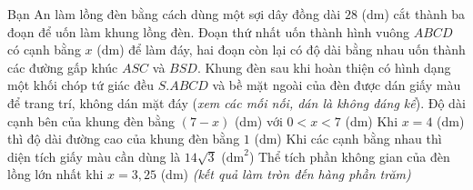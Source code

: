 \begin{ex}%
	Bạn An làm lồng đèn bằng cách dùng một sợi dây đồng dài $28$ (dm) cắt thành ba đoạn để uốn làm khung lồng đèn. Đoạn thứ nhất uốn thành hình vuông $ABCD$ có cạnh bằng $x$ (dm) để làm đáy, hai đoạn còn lại có độ dài bằng nhau uốn thành các đường gấp khúc $ASC$ và $BSD$. Khung đèn sau khi hoàn thiện có hình dạng một khối chóp tứ giác đều $S.ABCD$ và bề mặt ngoài của đèn được dán giấy màu để trang trí, không dán mặt đáy (\textit{xem các mối nối, dán là không đáng kể}).
	\choiceTF
	{\True Độ dài cạnh bên của khung đèn bằng $(7-x)$ (dm) với $0<x<7$ (dm)}
	{\True Khi $x=4$ (dm) thì độ dài đường cao của khung đèn bằng $1$ (dm)}
	{Khi các cạnh bằng nhau thì diện tích giấy màu cần dùng là $14\sqrt{3}$ ($\mathrm{dm}^2$)}
	{\True Thể tích phần không gian của đèn lồng lớn nhất khi $x=3{,}25$ (dm) \textit{(kết quả làm tròn đến hàng phần trăm)}}
\end{ex}
